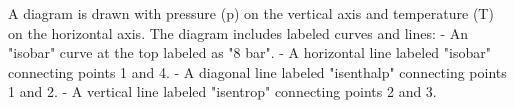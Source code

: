 A diagram is drawn with pressure (p) on the vertical axis and temperature (T) on the horizontal axis. The diagram includes labeled curves and lines:  
- An "isobar" curve at the top labeled as "8 bar".  
- A horizontal line labeled "isobar" connecting points 1 and 4.  
- A diagonal line labeled "isenthalp" connecting points 1 and 2.  
- A vertical line labeled "isentrop" connecting points 2 and 3.